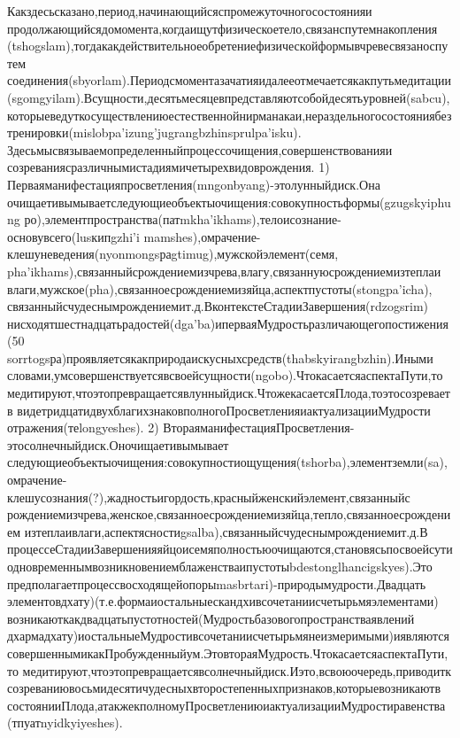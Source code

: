 {Какздесьсказано,период,начинающийсяспромежуточногосостоянияи
продолжающийсядомомента,когдаищутфизическоетело,связанспутемнакопления
(tshogslam),тогдакакдействительноеобретениефизическойформывчревесвязаноспутем
соединения(sbyorlam).Периодсмоментазачатияидалееотмечаетсякакпутьмедитации
(sgomgyilam).Всущности,десятьмесяцевпредставляютсобойдесятьуровней(sabcu),
которыеведуткосуществлениюестественнойнирманакаи,нераздельногосостояниябез
тренировки(mislobpa'izung'jugrangbzhinsprulpa'isku).
Здесьмысвязываемопределенныйпроцессочищения,совершенствованияи
созреваниясразличнымистадиямичетырехвидоврождения.
1)  Перваяманифестацияпросветления(mngonbyang)-этолунныйдиск.Она
очищаетивымываетследующиеобъектыочищения:совокупностьформы(gzugskyiphung
ро),элементпространства(патmkha'ikhams),телоисознание-основувсего(lusкипgzhi'i
mamshes),омрачение-клешуневедения(nyonmongsраgtimug),мужскойэлемент(семя,
pha'ikhams),связанныйсрождениемизчрева,влагу,связаннуюсрождениемизтеплаи
влаги,мужское(pha),связанноесрождениемизяйца,аспектпустоты(stongpa'icha),
связанныйсчудеснымрождениемит.д.ВконтекстеСтадииЗавершения(rdzogsrim)
нисходятшестнадцатьрадостей(dga'ba)иперваяМудростьразличающегопостижения(50
sorrtogsра)проявляетсякакприродаискусныхсредств(thabskyirangbzhin).Иными
словами,умсовершенствуетсявсвоейсущности(ngobo).ЧтокасаетсяаспектаПути,то
медитируют,чтоэтопревращаетсявлунныйдиск.ЧтожекасаетсяПлода,тоэтосозреваетв
видетридцатидвухблагихзнаковполногоПросветленияиактуализацииМудрости
отражения(теlongyeshes).
2)  ВтораяманифестацияПросветления-этосолнечныйдиск.Оночищаетивымывает
следующиеобъектыочищения:совокупностиощущения(tshorba),элементземли(sa),
омрачение-клешусознания(?),жадностьигордость,красныйженскийэлемент,связанныйс
рождениемизчрева,женское,связанноесрождениемизяйца,тепло,связанноесрождением
изтеплаивлаги,аспектясности{gsalba),связанныйсчудеснымрождениемит.д.В
процессеСтадииЗавершенияяйцоисемяполностьюочищаются,становясьпосвоейсути
одновременнымвозникновениемблаженстваипустоты{bdestonglhancigskyes).Это
предполагаетпроцессвосходящейопоры{masbrtari)-природымудрости.Двадцать
элементов{дхату)(т.е.формаиостальныескандхивсочетаниисчетырьмяэлементами)
возникаюткакдвадцатьпустотностей(Мудростьбазовогопространстваявлений
{дхармадхату)иостальныеМудростивсочетаниисчетырьмянеизмеримыми)иявляются
совершеннымикакПробужденныйум.ЭтовтораяМудрость.ЧтокасаетсяаспектаПути,то
медитируют,чтоэтопревращаетсявсолнечныйдиск.Иэто,всвоюочередь,приводитк
созреваниювосьмидесятичудесныхвторостепенныхпризнаков,которыевозникаютв
состоянииПлода,атакжекполномуПросветлениюиактуализацииМудростиравенства
(тпуатnyidkyiyeshes).
}}}}}}
